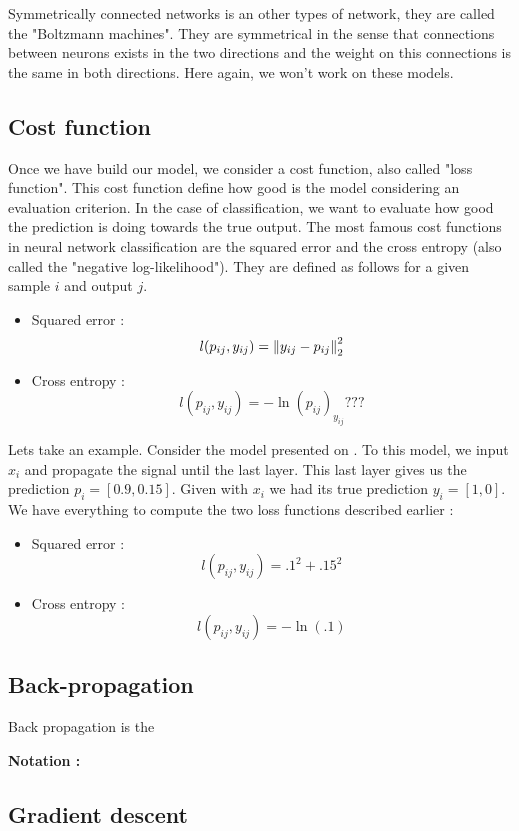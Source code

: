 		Symmetrically connected networks is an other types of network, they are called the "Boltzmann machines". They are symmetrical in the sense that connections between neurons exists in the two directions and the weight on this connections is the same in both directions. Here again, we won't work on these models.


	

	\subsection{Cost function}
		Once we have build our model, we consider a cost function, also called "loss function". This cost function define how good is the model considering an evaluation criterion. In the case of classification, we want to evaluate how good the prediction is doing towards the true output.
		The most famous cost functions in neural network classification are the squared error and the cross entropy (also called the "negative log-likelihood"). They are defined as follows for a given sample $i$ and output $j$.
		\begin{itemize}
			\item Squared error : $$ l(p_{ij},y_{ij}) = \left\lVert y_{ij} - p_{ij}\right\rVert_2^2 $$
			\item Cross entropy : $$ l(p_{ij},y_{ij}) = -\ln(p_{ij})_{y_{ij}}  ??? $$ 
		\end{itemize}

		Lets take an example. Consider the model presented on . To this model, we input $x_i$ and propagate the signal until the last layer. This last layer gives us the prediction $p_i = [0.9,0.15]$. Given with $x_i$ we had its true prediction $y_i = [1,0]$. We have everything to compute the two loss functions described earlier : 
		\begin{itemize}
			\item Squared error : $$ l(p_{ij},y_{ij}) =  .1^2 + .15^2 $$
			\item Cross entropy : $$ l(p_{ij},y_{ij}) = -\ln(.1)  $$
		\end{itemize}


	\subsection{Back-propagation}
		Back propagation is the 


		\vspace{1em}
		\textbf{Notation : }\\


	\subsection{Gradient descent}

		